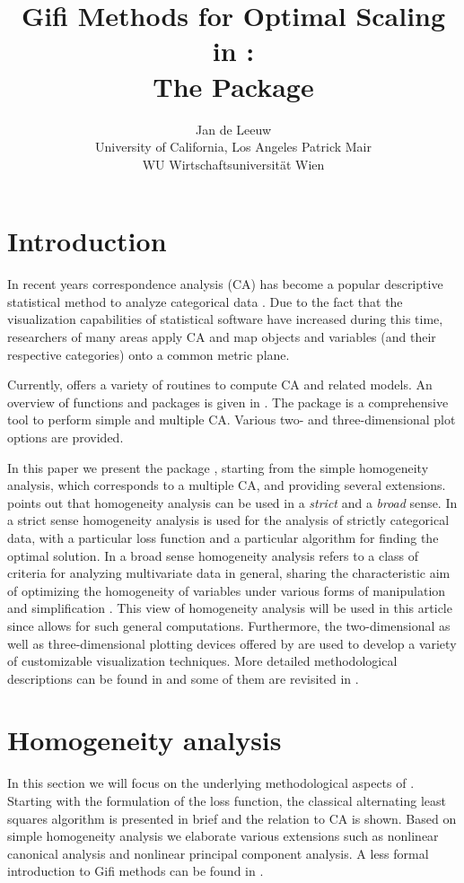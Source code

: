 \documentclass[article, nojss]{jss}
\author{Jan de Leeuw\\University of California, Los Angeles \And 
        Patrick Mair \\WU Wirtschaftsuniversit\"at Wien}
\title{Gifi Methods for Optimal Scaling in \proglang{R}:\\ The Package \pkg{homals}}
\begin{document}
\section{Introduction}
\label{sec:int}
In recent years correspondence analysis (CA) has become a popular descriptive statistical method to analyze categorical data \citep{Benzecri:73, Greenacre:84, Gifi:90, Greenacre+Blasius:06}. Due to the fact that the visualization capabilities of statistical software have increased during this time, researchers of many areas apply CA and map objects and variables (and their respective categories) onto a common metric plane. 

Currently,  \citep{R:07} offers a variety of routines to compute CA and related models. An overview of functions and packages is given in \citet{Mair+Hatzinger:07}. The package  \citep{Nenadic+Greenacre:06} is a comprehensive tool to perform simple and multiple CA. Various two- and three-dimensional plot options are provided.  

In this paper we present the  package , starting from the simple homogeneity analysis, which corresponds to a multiple CA, and providing several extensions. \citet{Gifi:90} points out that homogeneity analysis can be used in a \emph{strict} and a \emph{broad} sense. In a strict sense homogeneity analysis is used for the analysis of strictly categorical data, with a particular loss function and a particular algorithm for finding the optimal solution. In a broad sense homogeneity analysis refers to a class of criteria for analyzing multivariate data in general, sharing the characteristic aim of optimizing the homogeneity of variables under various forms of manipulation and simplification \citep[p. 81]{Gifi:90}. This view of homogeneity analysis will be used in this article since  allows for such general computations. Furthermore, the two-dimensional as well as three-dimensional plotting devices offered by  are used to develop a variety of customizable visualization techniques.    
More detailed methodological descriptions can be found in \citet{Gifi:90} and some of them are revisited in \citet{Michailidis+deLeeuw:98}. 


\section{Homogeneity analysis}
In this section we will focus on the underlying methodological aspects of . Starting with the formulation of the loss function, the classical alternating least squares algorithm is presented in brief and the relation to CA is shown. Based on simple homogeneity analysis we elaborate various extensions such as nonlinear canonical analysis and nonlinear principal component analysis. A less formal introduction to Gifi methods can be found in \citet{Mair+deLeeuw:2008}. 
\end{document}
